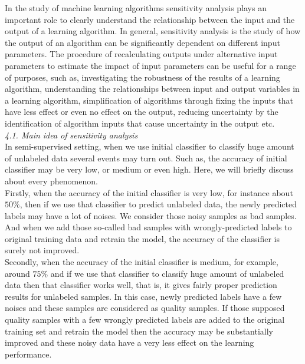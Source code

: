 \documentclass{article}
\begin{document}
		In the study of machine learning algorithms sensitivity analysis plays an important role to clearly understand the relationship between the input and the output of a learning algorithm. In general, sensitivity analysis is the study of how the output of an algorithm can be significantly dependent on different input parameters. The procedure of recalculating outputs under alternative input parameters to estimate the impact of input parameters can be useful for a range of purposes, such as, investigating the robustness of the results of a learning algorithm, understanding the relationships between input and output variables in a learning algorithm, simplification of algorithms through fixing the inputs that have less effect or even no effect on the output, reducing uncertainty by the identification of algorithm inputs that cause uncertainty in the output etc.\\
		
		\textit{4.1. Main idea of sensitivity analysis}\\
		
		In semi-supervised setting, when we use initial classifier to classify huge amount of unlabeled data several events may turn out. Such as, the accuracy of initial classifier may be very low, or medium or even high. Here, we will briefly discuss about every phenomenon.\\
		
		Firstly, when the accuracy of the initial classifier is very low, for instance about $50\%$, then if we use that
		classifier to predict unlabeled data, the newly predicted labels may have a lot of noises. We consider those noisy samples as bad samples. And when we add those so-called bad samples with wrongly-predicted labels to original training data and retrain the model, the accuracy of the classifier is surely not improved.\\
		
		Secondly, when the accuracy of the initial classifier is medium, for example, around $75\%$ and if we use that classifier to classify huge amount of unlabeled data then that classifier works well, that is, it gives fairly proper prediction results for unlabeled samples. In this case, newly predicted labels have a few noises and these samples are considered as quality samples. If those supposed quality samples with a few wrongly predicted labels are added to the original training set and retrain the model then the accuracy may be substantially improved and these noisy data have a very less effect on the learning performance.
		
\end{document}
